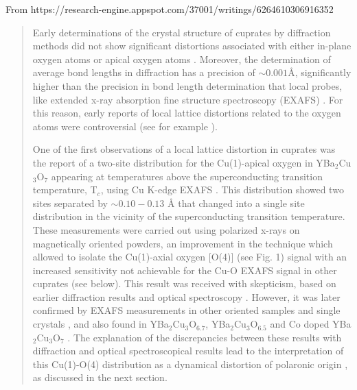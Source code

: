 From https://research-engine.appspot.com/37001/writings/6264610306916352

\begin{quote}
Early determinations of the crystal structure of cuprates by diffraction methods did not show significant distortions associated with either in-plane oxygen atoms or apical oxygen atoms \cite{Capponi1987,Schafer1988}. 
Moreover, the determination of  average bond lengths in diffraction has a precision of $\sim 0.001$\AA \cite{Miceli1988}, significantly higher than the precision in bond length determination that local probes, like extended x-ray absorption fine structure spectroscopy (EXAFS) \cite{Rehr2000}. 
For this reason, early reports of local lattice distortions related to the oxygen atoms  were controversial (see for example \cite{battlog1992lattice,Kwei1990}).

One of the first observations of a local lattice distortion in cuprates was the report of a two-site distribution for the Cu(1)-apical oxygen in YBa$_{2}$Cu$_{3}$O$_{7}$  appearing at temperatures above the superconducting transition temperature, T$_{c}$, using Cu K-edge EXAFS \cite{MustredeLeon1990,Conradson1990}.
This distribution showed two sites separated by $\sim 0.10-0.13$ \AA \cite{Conradson1990,MustredeLeon1992a} that changed into a single site distribution in the vicinity of the superconducting transition temperature. 
These measurements were carried out using polarized x-rays on magnetically oriented powders, an improvement in the technique which allowed to isolate the Cu(1)-axial oxygen [O(4)] (see Fig. 1) signal with an increased sensitivity not achievable for the Cu-O EXAFS signal in other cuprates (see below). 
This result was received with skepticism, based on earlier diffraction results \cite{battlog1992lattice,Kwei1990,Sharma1991} and optical spectroscopy \cite{Thomsen1993}. 
However, it was later confirmed by EXAFS measurements in other oriented samples \cite{Stern1993} and single crystals \cite{Booth1996}, and also found in YBa$_{2}$Cu$_{3}$O$_{6.7}$, YBa$_{2}$Cu$_{3}$O$_{6.5}$ and Co doped YBa$_{2}$Cu$_{3}$O$_{7}$ \cite{MustredeLeon1991}. 
The explanation of the discrepancies between these results with diffraction and optical spectroscopical results lead to the interpretation of  this Cu(1)-O(4) distribution as a dynamical distortion of polaronic origin \cite{MustredeLeon1992}, as discussed in the next section.


\end{quote}
